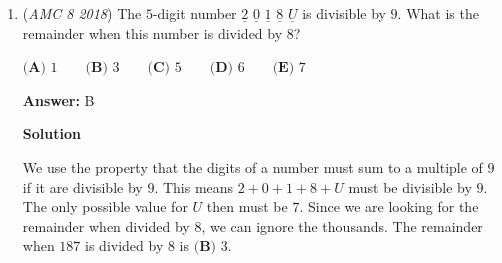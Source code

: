 \begin{enumerate}
\textbf{Solution 1}

Since Anh spends half an hour to drive 10 miles on the coastal road, his speed is [mathjax]r=\dfrac dt==20[/mathjax] mph. His speed on the highway then is [mathjax]60[/mathjax] mph. He drives [mathjax]50[/mathjax] miles, so he drives for [mathjax][/mathjax] hours, which is equal to [mathjax]50[/mathjax] minutes (Note that [mathjax]60[/mathjax] miles per hour is the same as [mathjax]1[/mathjax] mile per minute). The total amount of minutes spent on his trip is [mathjax]30+50\implies {}[/mathjax].

 



\textbf{Solution 2}

Since Anh drives [mathjax]3[/mathjax] times as fast on the highway, it takes him [mathjax][/mathjax] of the time to drive [mathjax]10[/mathjax] miles on the highway than on the coastal road. [mathjax][/mathjax] of [mathjax]30[/mathjax] is [mathjax]10[/mathjax], and since he drives [mathjax]50[/mathjax] miles on the highway, we multiply [mathjax]10[/mathjax] by [mathjax]5[/mathjax] to get [mathjax]50[/mathjax]. This means it took him [mathjax]50[/mathjax] minutes to drive on the highway, and if we add the [mathjax]30[/mathjax] minutes it took for him to drive on the coastal road, we would get [mathjax][/mathjax].

 -UnstoppableGoddess(helped by qkddud)

 


	\item (\textit{AMC 8 2018}) The $5$-digit number $\underline{2}$ $\underline{0}$ $\underline{1}$ $\underline{8}$ $\underline{U}$ is divisible by $9$. What is the remainder when this number is divided by $8$?


 $\textbf{(A) }1\qquad\textbf{(B) }3\qquad\textbf{(C) }5\qquad\textbf{(D) }6\qquad\textbf{(E) }7$

 \textbf{Answer: }B



\textbf{Solution}

We use the property that the digits of a number must sum to a multiple of $9$ if it are divisible by $9$. This means $2+0+1+8+U$ must be divisible by $9$. The only possible value for $U$ then must be $7$. Since we are looking for the remainder when divided by $8$, we can ignore the thousands. The remainder when $187$ is divided by $8$ is $\boxed{\textbf{(B) }3}$.


\end{enumerate}
